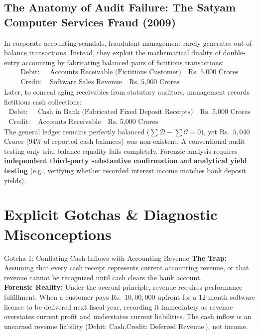 \subsection{The Anatomy of Audit Failure: The Satyam Computer Services Fraud (2009)}
In corporate accounting scandals, fraudulent management rarely generates out-of-balance transactions. Instead, they exploit the mathematical duality of double-entry accounting by fabricating balanced pairs of fictitious transactions:
\begin{align*}
\text{Debit: } & \text{Accounts Receivable (Fictitious Customer)} \quad \text{Rs.~5,000 Crores} \\
\text{Credit: } & \text{Software Sales Revenue} \quad \text{Rs.~5,000 Crores}
\end{align*}
Later, to conceal aging receivables from statutory auditors, management records fictitious cash collections:
\begin{align*}
\text{Debit: } & \text{Cash in Bank (Fabricated Fixed Deposit Receipts)} \quad \text{Rs.~5,000 Crores} \\
\text{Credit: } & \text{Accounts Receivable} \quad \text{Rs.~5,000 Crores}
\end{align*}
The general ledger remains perfectly balanced ($\sum \mathcal{D} - \sum \mathcal{C} = 0$), yet Rs.~$5{,}040$ Crores ($94\%$ of reported cash balances) was non-existent. A conventional audit testing only trial balance equality fails completely. Forensic analysis requires \textbf{independent third-party substantive confirmation} and \textbf{analytical yield testing} (e.g., verifying whether recorded interest income matches bank deposit yields).

\section{Explicit Gotchas \& Diagnostic Misconceptions}

\begin{trapbox}{Gotcha 1: Conflating Cash Inflows with Accounting Revenue}
\textbf{The Trap:} Assuming that every cash receipt represents current accounting revenue, or that revenue cannot be recognized until cash clears the bank account.\\
\textbf{Forensic Reality:} Under the accrual principle, revenue requires performance fulfillment. When a customer pays Rs.~$10{,}00,000$ upfront for a 12-month software license to be delivered next fiscal year, recording it immediately as revenue overstates current profit and understates current liabilities. The cash inflow is an unearned revenue liability ($\text{Debit: Cash}, \text{Credit: Deferred Revenue}$), not income.
\end{trapbox}

